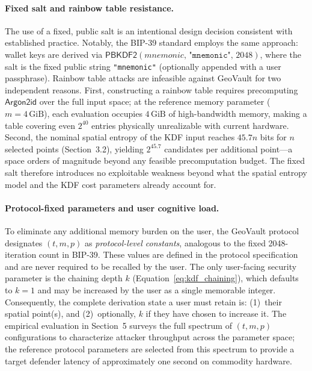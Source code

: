 \documentclass[journal,article,accept,pdftex,moreauthors]{Definitions/mdpi}
\begin{document}
\paragraph{Fixed salt and rainbow table resistance.} The use of a fixed, public salt is an intentional design decision consistent with established practice. Notably, the BIP-39 standard employs the same approach: wallet keys are derived via $\mathsf{PBKDF2}(\textit{mnemonic},\,\texttt{"mnemonic"},\,2048)$, where the salt is the fixed public string \texttt{"mnemonic"} (optionally appended with a user passphrase). Rainbow table attacks are infeasible against GeoVault for two independent reasons. First, constructing a rainbow table requires precomputing $\mathsf{Argon2id}$ over the full input space; at the reference memory parameter ($m = 4\,\mathrm{GiB}$), each evaluation occupies $4\,\mathrm{GiB}$ of high-bandwidth memory, making a table covering even $2^{40}$ entries physically unrealizable with current hardware. Second, the nominal spatial entropy of the KDF input reaches $45.7n$ bits for $n$ selected points (Section~3.2), yielding $2^{45.7}$ candidates per additional point---a space orders of magnitude beyond any feasible precomputation budget. The fixed salt therefore introduces no exploitable weakness beyond what the spatial entropy model and the KDF cost parameters already account for.

\paragraph{Protocol-fixed parameters and user cognitive load.} To eliminate any additional memory burden on the user, the GeoVault protocol designates $(t, m, p)$ as \emph{protocol-level constants}, analogous to the fixed 2048-iteration count in BIP-39. These values are defined in the protocol specification and are never required to be recalled by the user. The only user-facing security parameter is the chaining depth $k$ (Equation~\ref{eq:kdf_chaining}), which defaults to $k=1$ and may be increased by the user as a single memorable integer. Consequently, the complete derivation state a user must retain is: (1)~their spatial point(s), and (2)~optionally, $k$ if they have chosen to increase it. The empirical evaluation in Section~5 surveys the full spectrum of $(t, m, p)$ configurations to characterize attacker throughput across the parameter space; the reference protocol parameters are selected from this spectrum to provide a target defender latency of approximately one second on commodity hardware.
\end{document}
